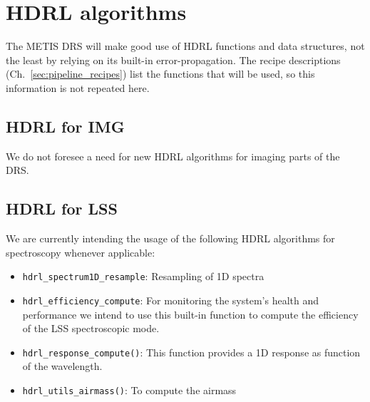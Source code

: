 \clearpage
\section{HDRL algorithms}\label{sec:hdrl_algorithms}

The METIS \ac{DRS} will make good use of \ac{HDRL} functions and data structures, not
the least by relying on its built-in error-propagation. The recipe descriptions
(Ch.~\ref{sec:pipeline_recipes}) list the functions that will be used, so this
information is not repeated here.

\subsection{HDRL for IMG}\label{ssec:hdrlimg}

We do not foresee a need for new \ac{HDRL} algorithms for imaging parts of the \ac{DRS}.


\subsection{HDRL for LSS}\label{ssec:hdrllss}
We are currently intending the usage of the following \ac{HDRL} algorithms for spectroscopy whenever applicable:
\begin{itemize}
    \item \texttt{hdrl\_spectrum1D\_resample}: Resampling of 1D spectra
    \item \texttt{hdrl\_efficiency\_compute}: For monitoring the system's health and performance we intend to use this built-in function to compute the efficiency of the \ac{LSS} spectroscopic mode.
    \item \texttt{hdrl\_response\_compute()}: This function provides a 1D response as function of the wavelength. 
    \item \texttt{hdrl\_utils\_airmass()}: To compute the airmass
\end{itemize}

